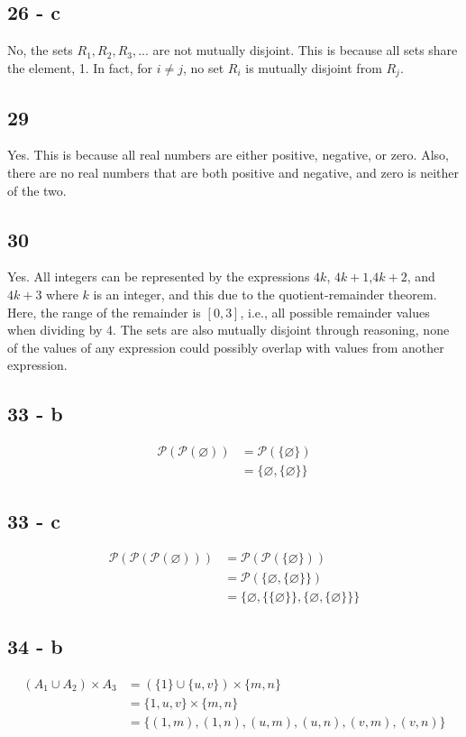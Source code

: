 \documentclass[12pt]{article}
\begin{document}
\subsection*{26 - c}
No, the sets $R_1, R_2, R_3,$... are not mutually disjoint. 
This is because all sets share the element, 1. In fact, for $i \neq j$, no set $R_i$ is mutually disjoint from $R_j$. 

\subsection*{29}
Yes. This is because all real numbers are either positive, negative, or zero. Also, there are no real numbers that are both positive and negative, and zero is neither of the two. 

\subsection*{30}
Yes. All integers can be represented by the expressions $4k$, $4k+1$,$4k+2$, and $4k+3$ where $k$ is an integer, and this due to the quotient-remainder theorem. Here, the range of the remainder is $[0,3]$, i.e., all possible remainder values when dividing by 4. The sets are also mutually disjoint through reasoning, none of the values of any expression could possibly overlap with values from another expression.

\subsection*{33 - b}
\begin{align*}
    \mathscr{P}(\mathscr{P}(\varnothing)) &= \mathscr{P}(\{\varnothing\}) \\
    &= \{\varnothing,\{\varnothing\}\}
\end{align*}

\subsection*{33 - c}
\begin{align*}
    \mathscr{P}(\mathscr{P}(\mathscr{P}(\varnothing))) &= \mathscr{P}(\mathscr{P}(\{\varnothing\})) \\
    &= \mathscr{P}(\{\varnothing,\{\varnothing\}\}) \\
    &= \{ \varnothing, \{\{\varnothing\}\}, \{ \varnothing, \{\varnothing\}\}\}
\end{align*}

\subsection*{34 - b}
\begin{align*}
    (A_1 \cup A_2) \times A_3 &= (\{1\} \cup \{u,v\})\times \{m,n\} \\
    &= \{1, u, v\} \times \{m,n\} \\
    &= \{(1, m), (1, n), (u, m), (u, n), (v, m), (v, n)\}
\end{align*}
\end{document}
